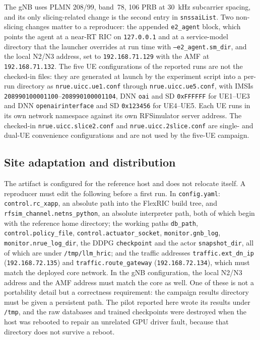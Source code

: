 The gNB uses PLMN 208/99, band~78, 106 PRB at 30~kHz subcarrier spacing, and its only slicing-related change is the second entry in \texttt{snssaiList}. Two non-slicing changes matter to a reproducer: the appended \texttt{e2\_agent} block, which points the agent at a near-RT RIC on \texttt{127.0.0.1} and at a service-model directory that the launcher overrides at run time with \texttt{--e2\_agent.sm\_dir}, and the local N2/N3 address, set to \texttt{192.168.71.129} with the AMF at \texttt{192.168.71.132}. The five UE configurations of the reported runs are not the checked-in files: they are generated at launch by the experiment script into a per-run directory as \texttt{nrue.uicc.ue1.conf} through \texttt{nrue.uicc.ue5.conf}, with IMSIs \texttt{208990100001100}--\texttt{208990100001104}, DNN \texttt{oai} and SD \texttt{0xFFFFFF} for UE1--UE3 and DNN \texttt{openairinterface} and SD \texttt{0x123456} for UE4--UE5. Each UE runs in its own network namespace against its own RFSimulator server address. The checked-in \texttt{nrue.uicc.slice2.conf} and \texttt{nrue.uicc.2slice.conf} are single- and dual-UE convenience configurations and are not used by the five-UE campaign.

\subsection{Site adaptation and distribution}
The artifact is configured for the reference host and does not relocate itself. A reproducer must edit the following before a first run. In \texttt{config.yaml}: \texttt{control.rc\_xapp}, an absolute path into the FlexRIC build tree, and \texttt{rfsim\_channel.netns\_python}, an absolute interpreter path, both of which begin with the reference home directory; the working paths \texttt{db\_path}, \texttt{control.policy\_file}, \texttt{control.actuator\_socket}, \texttt{monitor.gnb\_log}, \texttt{monitor.nrue\_log\_dir}, the DDPG \texttt{checkpoint} and the actor \texttt{snapshot\_dir}, all of which are under \texttt{/tmp/llm\_hric}; and the traffic addresses \texttt{traffic.ext\_dn\_ip} (\texttt{192.168.72.135}) and \texttt{traffic.route\_gateway} (\texttt{192.168.72.134}), which must match the deployed core network. In the gNB configuration, the local N2/N3 address and the AMF address must match the core as well. One of these is not a portability detail but a correctness requirement: the campaign results directory must be given a persistent path. The pilot reported here wrote its results under \texttt{/tmp}, and the raw databases and trained checkpoints were destroyed when the host was rebooted to repair an unrelated GPU driver fault, because that directory does not survive a reboot.


